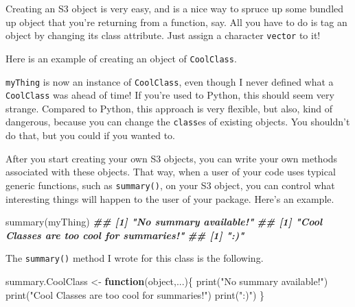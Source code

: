 \documentclass[
  12pt,
  krantz2]{krantz}
\makeatletter
\newenvironment{Shaded}{\begin{snugshade}}{\end{snugshade}}
\newcommand{\CommentTok}[1]{\textcolor[rgb]{0.37,0.37,0.37}{\textit{#1}}}
\newcommand{\ControlFlowTok}[1]{\textcolor[rgb]{0.27,0.27,0.27}{\textbf{#1}}}
\newcommand{\DecValTok}[1]{\textcolor[rgb]{0.06,0.06,0.06}{#1}}
\newcommand{\DocumentationTok}[1]{\textcolor[rgb]{0.37,0.37,0.37}{\textbf{\textit{#1}}}}
\newcommand{\FunctionTok}[1]{\textcolor[rgb]{0,0,0}{#1}}
\newcommand{\NormalTok}[1]{#1}
\newcommand{\OtherTok}[1]{\textcolor[rgb]{0.37,0.37,0.37}{#1}}
\newcommand{\SpecialCharTok}[1]{\textcolor[rgb]{0,0,0}{#1}}
\newcommand{\StringTok}[1]{\textcolor[rgb]{0.5,0.5,0.5}{#1}}
\newenvironment{kframe}{%
\medskip{}
\setlength{\fboxsep}{.8em}
 \def\at@end@of@kframe{}%
 \ifinner\ifhmode%
  \def\at@end@of@kframe{\end{minipage}}%
  \begin{minipage}{\columnwidth}%
 \fi\fi%
 \def\FrameCommand##1{\hskip\@totalleftmargin \hskip-\fboxsep
 \colorbox{shadecolor}{##1}\hskip-\fboxsep
     \hskip-\linewidth \hskip-\@totalleftmargin \hskip\columnwidth}%
 \MakeFramed {\advance\hsize-\width
   \@totalleftmargin\z@ \linewidth\hsize
   \@setminipage}}%
 {\par\unskip\endMakeFramed%
 \at@end@of@kframe}
\renewenvironment{Shaded}{\begin{kframe}}{\end{kframe}}
\makeatother
\begin{document}
Creating an S3 object is very easy, and is a nice way to spruce up some bundled up object that you're returning from a function, say. All you have to do is tag an object by changing its class attribute. Just assign a character \texttt{vector} to it!

Here is an example of creating an object of \texttt{CoolClass}.

\begin{Shaded}
\end{Shaded}

\texttt{myThing} is now an instance of \texttt{CoolClass}, even though I never defined what a \texttt{CoolClass} was ahead of time! If you're used to Python, this should seem very strange. Compared to Python, this approach is very flexible, but also, kind of dangerous, because you can change the \texttt{class}es of existing objects. You shouldn't do that, but you could if you wanted to.

After you start creating your own S3 objects, you can write your own methods associated with these objects. That way, when a user of your code uses typical generic functions, such as \texttt{summary()}, on your S3 object, you can control what interesting things will happen to the user of your package. Here's an example.

\begin{Shaded}
\begin{Highlighting}[]
\FunctionTok{summary}\NormalTok{(myThing)}
\DocumentationTok{\#\# [1] "No summary available!"}
\DocumentationTok{\#\# [1] "Cool Classes are too cool for summaries!"}
\DocumentationTok{\#\# [1] ":)"}
\end{Highlighting}
\end{Shaded}

The \texttt{summary()} method I wrote for this class is the following.

\begin{Shaded}
\begin{Highlighting}[]
\NormalTok{summary.CoolClass }\OtherTok{\textless{}{-}} \ControlFlowTok{function}\NormalTok{(object,...)\{}
  \FunctionTok{print}\NormalTok{(}\StringTok{"No summary available!"}\NormalTok{)}
  \FunctionTok{print}\NormalTok{(}\StringTok{"Cool Classes are too cool for summaries!"}\NormalTok{)}
  \FunctionTok{print}\NormalTok{(}\StringTok{":)"}\NormalTok{)}
\NormalTok{\}}
\end{Highlighting}
\end{Shaded}
\end{document}

